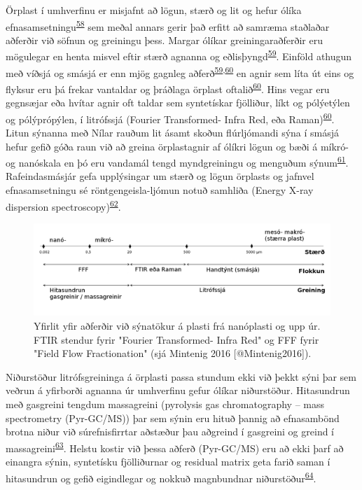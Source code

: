 \documentclass[icelandic,]{book}
\begin{document}
Örplast í umhverfinu er misjafnt að lögun, stærð og lit og hefur ólíka efnasamsetningu\textsuperscript{\protect\hyperlink{ref-phuong2016there}{58}} sem meðal annars gerir það erfitt að samræma staðlaðar aðferðir við söfnun og greiningu þess.
Margar ólíkar greiningaraðferðir eru mögulegar en henta misvel eftir stærð agnanna og eðlisþyngd\textsuperscript{\protect\hyperlink{ref-hepso2018experimental}{59}}. Einföld athugun með víðsjá og smásjá er enn mjög gagnleg aðferð\textsuperscript{\protect\hyperlink{ref-hepso2018experimental}{59},\protect\hyperlink{ref-SONG2015202}{60}} en agnir sem líta út eins og flyksur eru þá frekar vantaldar og þráðlaga örplast oftalið\textsuperscript{\protect\hyperlink{ref-SONG2015202}{60}}. Hins vegar eru gegnsæjar eða hvítar agnir oft taldar sem syntetískar fjölliður, líkt og pólýetýlen og pólýprópýlen, í litrófssjá (Fourier Transformed- Infra Red, eða Raman)\textsuperscript{\protect\hyperlink{ref-SONG2015202}{60}}. Litun sýnanna með Nílar rauðum lit ásamt skoðun flúrljómandi sýna í smásjá hefur gefið góða raun við að greina örplastagnir af ólíkri lögun og bæði á míkró- og nanóskala en þó eru vandamál tengd myndgreiningu og menguðum sýnum\textsuperscript{\protect\hyperlink{ref-SHIM2016469}{61}}. Rafeindasmásjár gefa upplýsingar um stærð og lögun örplasts og jafnvel efnasamsetningu sé röntgengeisla-ljómun notuð samhliða (Energy X-ray dispersion spectroscopy)\textsuperscript{\protect\hyperlink{ref-bitam2014bio2}{62}}.

\begin{figure}

{\centering \includegraphics[width=1\linewidth]{myndir/synataka} 

}

\caption{Yfirlit yfir aðferðir við sýnatökur á plasti frá nanóplasti og upp úr. FTIR stendur fyrir "Fourier Transformed- Infra Red" og FFF fyrir "Field Flow Fractionation" (sjá Mintenig 2016 [@Mintenig2016]).}\label{fig:FTIR}
\end{figure}

Niðurstöður litrófsgreininga á örplasti passa stundum ekki við þekkt sýni þar sem veðrun á yfirborði agnanna úr umhverfinu gefur ólíkar niðurstöður.
Hitasundrun með gasgreini tengdum massagreini (pyrolysis gas chromatography -- mass spectrometry (Pyr-GC/MS)) þar sem sýnin eru hituð þannig að efnasambönd brotna niður við súrefnisfirrtar aðstæður þau aðgreind í gasgreini og greind í massagreini\textsuperscript{\protect\hyperlink{ref-k22014bio2}{63}}. Helstu kostir við þessa aðferð (Pyr-GC/MS) eru að ekki þarf að einangra sýnin, syntetísku fjölliðurnar og residual matrix geta farið saman í hitasundrun og gefið eigindlegar og nokkuð magnbundnar niðurstöður\textsuperscript{\protect\hyperlink{ref-Fischer2017}{64}}.
\end{document}
